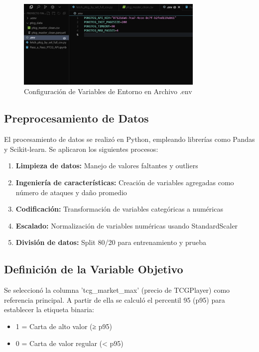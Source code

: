 \documentclass[12pt,letterpaper]{article}
\begin{document}
\begin{figure}[H]
\centering
\includegraphics[width=0.8\textwidth]{imagenes/Imagen4.png}
\caption{Configuración de Variables de Entorno en Archivo .env}
\label{fig:configuracion_env}
\end{figure}

\subsection{Preprocesamiento de Datos}

El procesamiento de datos se realizó en Python, empleando librerías como Pandas y Scikit-learn. Se aplicaron los siguientes procesos:

\begin{enumerate}
    \item \textbf{Limpieza de datos:} Manejo de valores faltantes y outliers
    \item \textbf{Ingeniería de características:} Creación de variables agregadas como número de ataques y daño promedio
    \item \textbf{Codificación:} Transformación de variables categóricas a numéricas
    \item \textbf{Escalado:} Normalización de variables numéricas usando StandardScaler
    \item \textbf{División de datos:} Split 80/20 para entrenamiento y prueba
\end{enumerate}

\subsection{Definición de la Variable Objetivo}

Se seleccionó la columna 'tcg\_market\_max' (precio de TCGPlayer) como referencia principal. A partir de ella se calculó el percentil 95 (p95) para establecer la etiqueta binaria:
\begin{itemize}
    \item 1 = Carta de alto valor (≥ p95)
    \item 0 = Carta de valor regular (< p95)
\end{itemize}
\end{document}
